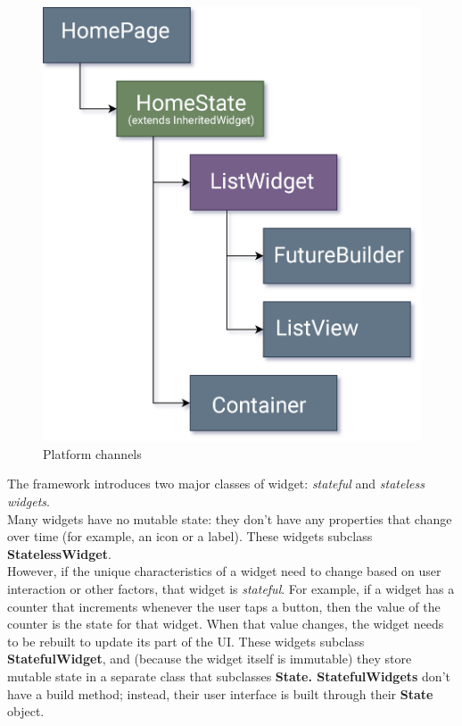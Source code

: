 \documentclass[table, 12pt]{article}
\begin{document}
\begin{figure}[H]
    \includegraphics[width=\textwidth]{assets/inherited-widget.png}
    \caption{Platform channels}
    \label{spring_mvc_request}
\end{figure}
The framework introduces two major classes of widget: \textit{stateful} and \textit{stateless widgets}.\\
Many widgets have no mutable state: they don’t have any properties that change over time (for example, an icon or a label). These widgets subclass \textbf{StatelessWidget}.\\
However, if the unique characteristics of a widget need to change based on user interaction or other factors, that widget is \textit{stateful}. For example, if a widget has a counter that increments whenever the user taps a button, then the value of the counter is the state for that widget. When that value changes, the widget needs to be rebuilt to update its part of the UI. These widgets subclass \textbf{StatefulWidget}, and (because the widget itself is immutable) they store mutable state in a separate class that subclasses \textbf{State. StatefulWidgets} don’t have a build method; instead, their user interface is built through their \textbf{State} object.\\
\end{document}
